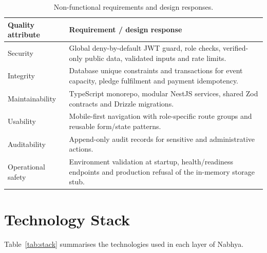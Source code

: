 \begin{table}[H]\centering
\caption{Non-functional requirements and design responses.}
\label{tab:nfr}
\begin{tabularx}{\textwidth}{|p{}|X|}
\hline
\textbf{Quality attribute} & \textbf{Requirement / design response}\\\hline
Security & Global deny-by-default JWT guard, role checks, verified-only public data, validated inputs and rate limits.\\\hline
Integrity & Database unique constraints and transactions for event capacity, pledge fulfilment and payment idempotency.\\\hline
Maintainability & TypeScript monorepo, modular NestJS services, shared Zod contracts and Drizzle migrations.\\\hline
Usability & Mobile-first navigation with role-specific route groups and reusable form/state patterns.\\\hline
Auditability & Append-only audit records for sensitive and administrative actions.\\\hline
Operational safety & Environment validation at startup, health/readiness endpoints and production refusal of the in-memory storage stub.\\\hline
\end{tabularx}
\end{table}

\section{Technology Stack}
Table~\ref{tab:stack} summarises the technologies used in each layer of Nabhya.

